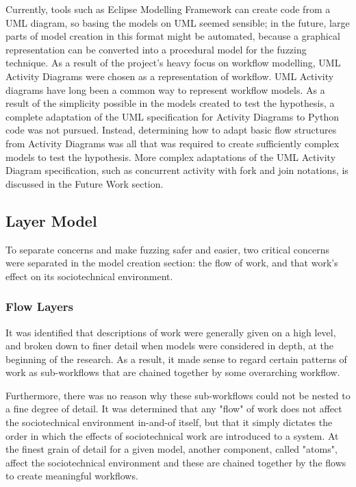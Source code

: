 Currently, tools such as Eclipse Modelling Framework\cite{EMFManual} can create code from a UML diagram, so basing the models on UML seemed sensible; in the future, large parts of model creation in this format might be automated, because a graphical representation can be converted into a procedural model for the fuzzing technique. As a result of the project's heavy focus on workflow modelling, UML Activity Diagrams\cite{Omg2010} were chosen as a representation of workflow. UML Activity diagrams have long been a common way to represent workflow models\cite{Gogolla2001}. As a result of the simplicity possible in the models created to test the hypothesis, a complete adaptation of the UML specification for Activity Diagrams to Python code was not pursued. Instead, determining how to adapt basic flow structures from Activity Diagrams was all that was required to create sufficiently complex models to test the hypothesis. More complex adaptations of the UML Activity Diagram specification, such as concurrent activity with fork and join notations, is discussed in the Future Work section. \par%

\subsection{Layer Model}%
To separate concerns and make fuzzing safer and easier, two critical concerns were separated in the model creation section: the flow of work, and that work's effect on its sociotechnical environment. \par

\subsubsection{Flow Layers}
It was identified that descriptions of work were generally given on a high level, and broken down to finer detail when models were considered in depth, at the beginning of the research. As a result, it made sense to regard certain patterns of work as sub-workflows that are chained together by some overarching workflow. \par

Furthermore, there was no reason why these sub-workflows could not be nested to a fine degree of detail. It was determined that any "flow" of work does not affect the sociotechnical environment in-and-of itself, but that it simply dictates the order in which the effects of sociotechnical work are introduced to a system. At the finest grain of detail for a given model, another component, called "atoms", affect the sociotechnical environment and these are chained together by the flows to create meaningful workflows. \par

